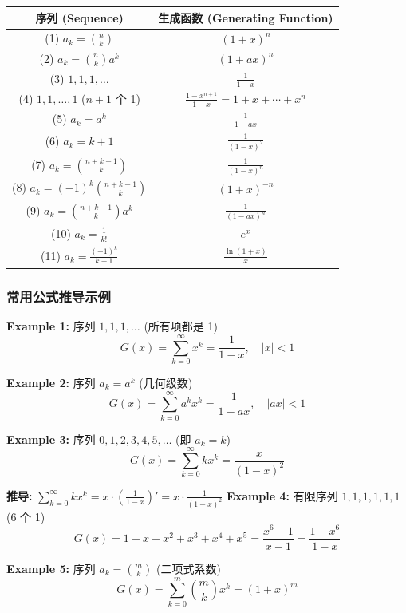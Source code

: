\documentclass[10pt,a4paper,openany]{ctexbook}
\theoremstyle{definition}
\theoremstyle{remark}
\begin{document}
\begin{center}
\begin{tabular}{cc}
\hline
序列 (Sequence) & 生成函数 (Generating Function) \\ \hline
(1) $a_k = \binom{n}{k}$ & $(1+x)^n$ \\
(2) $a_k = \binom{n}{k} a^k$ & $(1+ax)^n$ \\
(3) $1,1,1,\dots$ & $\frac{1}{1-x}$ \\
(4) $1,1,\dots,1$ ($n+1$ 个 1) & $\frac{1-x^{n+1}}{1-x} = 1 + x + \cdots + x^n$ \\
(5) $a_k = a^k$ & $\frac{1}{1-ax}$ \\
(6) $a_k = k+1$ & $\frac{1}{(1-x)^2}$ \\
(7) $a_k = \binom{n+k-1}{k}$ & $\frac{1}{(1-x)^n}$ \\
(8) $a_k = (-1)^k \binom{n+k-1}{k}$ & $(1+x)^{-n}$ \\
(9) $a_k = \binom{n+k-1}{k} a^k$ & $\frac{1}{(1-ax)^n}$ \\
(10) $a_k = \frac{1}{k!}$ & $e^x$ \\
(11) $a_k = \frac{(-1)^k}{k+1}$ & $\frac{\ln(1+x)}{x}$ \\
\hline
\end{tabular}

\end{center}

\vspace{-2pt}

\subsubsection{常用公式推导示例}

\textbf{Example 1:} 序列 $1, 1, 1, \dots$ (所有项都是 1)
\[
G(x) = \sum_{k=0}^{\infty} x^k = \frac{1}{1-x}, \quad |x| < 1
\]

\textbf{Example 2:} 序列 $a_k = a^k$ (几何级数)
\[
G(x) = \sum_{k=0}^{\infty} a^k x^k = \frac{1}{1-ax}, \quad |ax| < 1
\]

\textbf{Example 3:} 序列 $0, 1, 2, 3, 4, 5, \dots$ (即 $a_k = k$)
\[
G(x) = \sum_{k=0}^{\infty} k x^k = \frac{x}{(1-x)^2}
\]

\textbf{推导:} $\sum_{k=0}^\infty k x^k = x \cdot \left(\frac{1}{1-x}\right)' = x \cdot \frac{1}{(1-x)^2}$
\textbf{Example 4:} 有限序列 $1, 1, 1, 1, 1, 1$ (6 个 1)
\[
G(x) = 1 + x + x^2 + x^3 + x^4 + x^5 = \frac{x^6 - 1}{x-1} = \frac{1-x^6}{1-x}
\]

\textbf{Example 5:} 序列 $a_k = \binom{m}{k}$ (二项式系数)
\[
G(x) = \sum_{k=0}^m \binom{m}{k} x^k = (1+x)^m
\]
\end{document}
